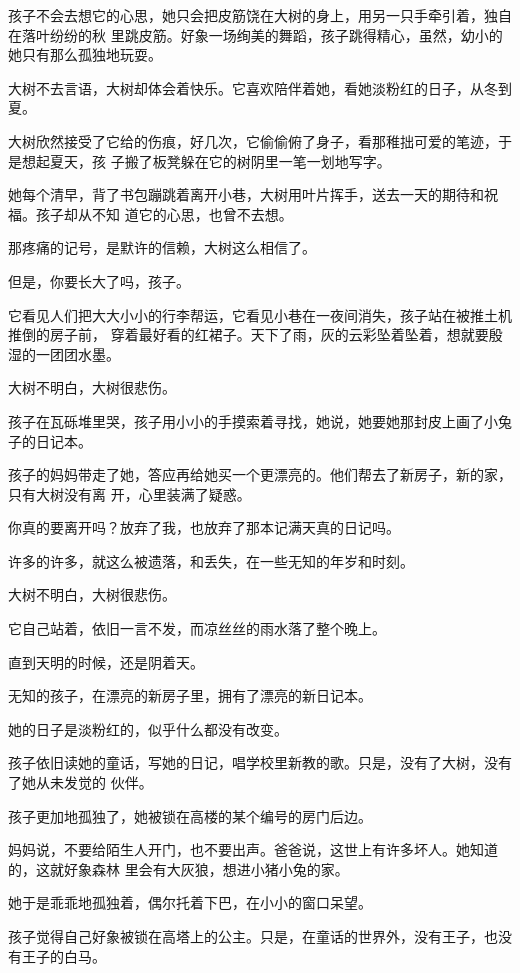 \documentclass[12pt,a4paper]{article}
\begin{document}
		孩子不会去想它的心思，她只会把皮筋饶在大树的身上，用另一只手牵引着，独自在落叶纷纷的秋
	里跳皮筋。好象一场绚美的舞蹈，孩子跳得精心，虽然，幼小的她只有那么孤独地玩耍。

		大树不去言语，大树却体会着快乐。它喜欢陪伴着她，看她淡粉红的日子，从冬到夏。

		大树欣然接受了它给的伤痕，好几次，它偷偷俯了身子，看那稚拙可爱的笔迹，于是想起夏天，孩
	子搬了板凳躲在它的树阴里一笔一划地写字。

		她每个清早，背了书包蹦跳着离开小巷，大树用叶片挥手，送去一天的期待和祝福。孩子却从不知
	道它的心思，也曾不去想。

		那疼痛的记号，是默许的信赖，大树这么相信了。

		但是，你要长大了吗，孩子。

		它看见人们把大大小小的行李帮运，它看见小巷在一夜间消失，孩子站在被推土机推倒的房子前，
	穿着最好看的红裙子。天下了雨，灰的云彩坠着坠着，想就要殷湿的一团团水墨。


		大树不明白，大树很悲伤。

		孩子在瓦砾堆里哭，孩子用小小的手摸索着寻找，她说，她要她那封皮上画了小兔子的日记本。

		孩子的妈妈带走了她，答应再给她买一个更漂亮的。他们帮去了新房子，新的家，只有大树没有离
	开，心里装满了疑惑。

		你真的要离开吗？放弃了我，也放弃了那本记满天真的日记吗。

		许多的许多，就这么被遗落，和丢失，在一些无知的年岁和时刻。


		大树不明白，大树很悲伤。

		它自己站着，依旧一言不发，而凉丝丝的雨水落了整个晚上。

		直到天明的时候，还是阴着天。


		无知的孩子，在漂亮的新房子里，拥有了漂亮的新日记本。

		她的日子是淡粉红的，似乎什么都没有改变。

		孩子依旧读她的童话，写她的日记，唱学校里新教的歌。只是，没有了大树，没有了她从未发觉的
	伙伴。


		孩子更加地孤独了，她被锁在高楼的某个编号的房门后边。

		妈妈说，不要给陌生人开门，也不要出声。爸爸说，这世上有许多坏人。她知道的，这就好象森林
	里会有大灰狼，想进小猪小兔的家。

		她于是乖乖地孤独着，偶尔托着下巴，在小小的窗口呆望。

		孩子觉得自己好象被锁在高塔上的公主。只是，在童话的世界外，没有王子，也没有王子的白马。
\end{document}
